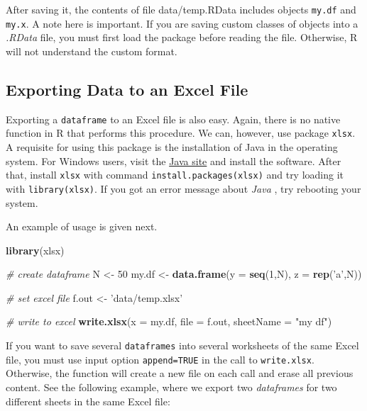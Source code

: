 \documentclass[11pt,]{book}
\newenvironment{Shaded}{\begin{snugshade}}{\end{snugshade}}
\newcommand{\KeywordTok}[1]{\textcolor[rgb]{0.27,0.27,0.27}{\textbf{#1}}}
\newcommand{\DataTypeTok}[1]{\textcolor[rgb]{0.27,0.27,0.27}{#1}}
\newcommand{\DecValTok}[1]{\textcolor[rgb]{0.06,0.06,0.06}{#1}}
\newcommand{\StringTok}[1]{\textcolor[rgb]{0.5,0.5,0.5}{#1}}
\newcommand{\CommentTok}[1]{\textcolor[rgb]{0.56,0.35,0.01}{\textit{#1}}}
\newcommand{\NormalTok}[1]{#1}
\begin{document}
After saving it, the contents of file data/temp.RData includes objects
\texttt{my.df} and \texttt{my.x}. A note here is important. If you are
saving custom classes of objects into a \emph{.RData} file, you must
first load the package before reading the file. Otherwise, R will not
understand the custom format.

\subsection{Exporting Data to an Excel
File}\label{exporting-data-to-an-excel-file}

Exporting a \texttt{dataframe} to an Excel file is also easy. Again,
there is no native function in R that performs this procedure. We can,
however, use package \texttt{xlsx}. A requisite for using this package
is the installation of Java in the operating system. For Windows users,
visit the \href{https://www.java.com/pt_BR/}{Java site} and install the
software. After that, install \texttt{xlsx} with command
\texttt{install.packages(\textquotesingle{}xlsx\textquotesingle{})} and
try loading it with \texttt{library(xlsx)}. If you got an error message
about \emph{Java} , try rebooting your system. 

An example of usage is given next.

\begin{Shaded}
\begin{Highlighting}[]
\KeywordTok{library}\NormalTok{(xlsx)}

\CommentTok{# create dataframe}
\NormalTok{N <-}\StringTok{ }\DecValTok{50}
\NormalTok{my.df <-}\StringTok{ }\KeywordTok{data.frame}\NormalTok{(}\DataTypeTok{y =} \KeywordTok{seq}\NormalTok{(}\DecValTok{1}\NormalTok{,N), }\DataTypeTok{z =} \KeywordTok{rep}\NormalTok{(}\StringTok{'a'}\NormalTok{,N))}

\CommentTok{# set excel file}
\NormalTok{f.out <-}\StringTok{ 'data/temp.xlsx'}

\CommentTok{# write to excel}
\KeywordTok{write.xlsx}\NormalTok{(}\DataTypeTok{x =}\NormalTok{ my.df, }\DataTypeTok{file =}\NormalTok{ f.out, }\DataTypeTok{sheetName =} \StringTok{"my df"}\NormalTok{)}
\end{Highlighting}
\end{Shaded}

If you want to save several \texttt{dataframes} into several worksheets
of the same Excel file, you must use input option \texttt{append=TRUE}
in the call to \texttt{write.xlsx}. Otherwise, the function will create
a new file on each call and erase all previous content. See the
following example, where we export two \emph{dataframes} for two
different sheets in the same Excel file: 
\end{document}
